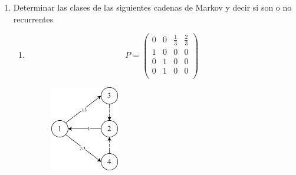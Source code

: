 \documentclass{templateNote}
\begin{document}
\begin{enumerate}[start = 6]
    \newpage
    \item Determinar las clases de las siguientes cadenas de Markov y decir si son o no recurrentes
    \begin{enumerate}[label=\alph*)]
        \item 
        \[
        P = \begin{pmatrix}
            0 & 0 & \frac{1}{3} & \frac{2}{3} \\
            1 & 0 & 0 & 0 \\
            0 & 1 & 0 & 0 \\
            0 & 1 & 0 & 0 \\
        \end{pmatrix}
        \]

        \begin{figure}[H]
            \centering
            \includegraphics[width=0.3\textwidth]{img/ejer5_2.png}
        \end{figure}


\end{enumerate}
\end{enumerate}
\end{document}
